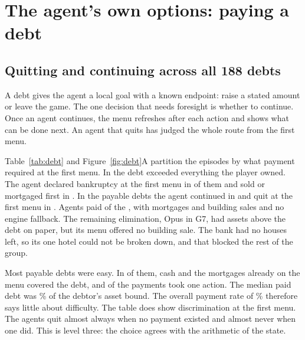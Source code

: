 \section{The agent's own options: paying a debt}
\label{sec:own}

\subsection{Quitting and continuing across all 188 debts}
A debt gives the agent a local goal with a known endpoint: raise a stated amount or leave the game. The one decision that needs foresight is whether to continue. Once an agent continues, the menu refreshes after each action and shows what can be done next. An agent that quits has judged the whole route from the first menu.

Table~\ref{tab:debt} and Figure~\ref{fig:debt}A partition the  episodes by what payment required at the first menu. In  the debt exceeded everything the player owned. The agent declared bankruptcy at the first menu in  of them and sold or mortgaged first in . In the  payable debts the agent continued in  and quit at the first menu in . Agents paid  of the , with  mortgages and  building sales and no engine fallback. The remaining elimination, Opus in G7, had assets above the debt on paper, but its menu offered no building sale. The bank had no houses left, so its one hotel could not be broken down, and that blocked the rest of the group.

\begin{table}[t]\centering\small
\TableDebt
\caption{All  debt episodes. Rows one to three split the  payable debts by the least the first menu required. ``Quit at first menu'' counts bankruptcy declared as the first action. The  other debts above every asset ended in elimination after some liquidation.}
\label{tab:debt}\end{table}

Most payable debts were easy. In  of them, cash and the mortgages already on the menu covered the debt, and  of the  payments took one action. The median paid debt was \% of the debtor's asset bound. The overall payment rate of \% therefore says little about difficulty. The table does show discrimination at the first menu. The agents quit almost always when no payment existed and almost never when one did. This is level three: the choice agrees with the arithmetic of the state.

